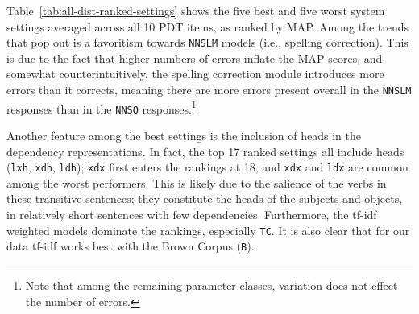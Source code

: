 \documentclass[11pt,letterpaper]{article}
\newcommand{\param}[1]{\texttt{#1}}
\newcommand{\md}[1]{\marginpar{\scriptsize MD: #1}}
\newcommand{\lk}[1]{\marginpar{\scriptsize LK: #1}}
\renewcommand{\marginpar}[1]{}
\begin{document}
Table~\ref{tab:all-dist-ranked-settings} shows the five best and five
worst system settings averaged across all 10 PDT items, as ranked by
MAP. Among the trends that pop out is a favoritism
towards \param{NNSLM} models (i.e., spelling correction). This is due
to the fact that higher numbers of errors inflate the MAP scores, and
somewhat counterintuitively, the spelling correction module introduces
more errors than it corrects, meaning there are more errors present
overall in the \param{NNSLM} responses than in the \param{NNSO}
responses.\footnote{Note that among the remaining parameter classes,
  variation does not effect the number of errors.}

Another feature among the best settings is the inclusion of heads in the dependency representations. In fact, the top 17 ranked settings all include heads (\param{lxh}, \param{xdh}, \param{ldh}); \param{xdx} first enters the rankings at 18, and \param{xdx} and \param{ldx} are common among the worst performers. This is likely due to the salience of the verbs in these transitive sentences; they constitute the heads of the subjects and objects, in relatively short sentences with few dependencies.
Furthermore, the tf-idf weighted models dominate the rankings, especially \param{TC}. It is also clear that for our data tf-idf works best with the Brown Corpus (\param{B}).
\end{document}
